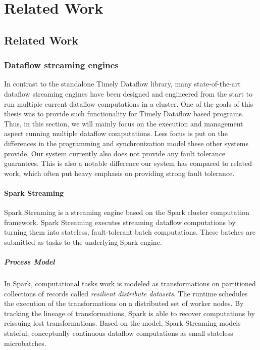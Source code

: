 \chapter{Related Work} \label{ch:related}

\section{Related Work}

\subsection{Dataflow streaming engines}

In contrast to the standalone Timely Dataflow library, many state-of-the-art
dataflow streaming engines have been designed and engineered from the start
to run multiple current dataflow computations in a cluster. One of the
goals of this thesis was to provide such functionality for Timely Dataflow
based programs. Thus, in this section, we will mainly focus on the execution
and management aspect running multiple dataflow computations. Less focus is
put on the differences in the programming and synchronization model these 
other systems provide. Our system currently also does not provide any fault
tolerance guarantees. This is also a notable difference our system has compared
to related work, which often put heavy emphasis on providing strong fault
tolerance.

\subsubsection{Spark Streaming}

Spark Streaming \cite{sparkstreaming} is a streaming engine based on the Spark
cluster computation framework. Spark Streaming executes streaming dataflow
computations by turning them into stateless, fault-tolerant batch computations.
These batches are submitted as tasks to the underlying Spark engine. \cite{spark} 

\paragraph{Process Model}

In Spark, computational tasks work is modeled as transformations on partitioned
collections of records called \emph{resilient distribute datasets}. The
runtime schedules the execution of the transformations on a distributed set of
worker nodes. By tracking the lineage of transformations, Spark is able to
recover computations by reissuing lost transformations. Based on the model,
Spark Streaming models stateful, conceptually continuous dataflow computations
as small stateless microbatches.

